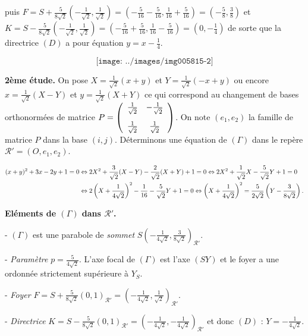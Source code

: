 {\begin{enumerate}
{puis $F=S+\frac{5}{8\sqrt{2}}\left(-\frac{1}{\sqrt{2}},\frac{1}{\sqrt{2}}\right)=\left(-\frac{5}{16}-\frac{5}{16},\frac{1}{16}+\frac{5}{16}\right)=\left(-\frac{5}{8},\frac{3}{8}\right)$  
et $K =S-\frac{5}{8\sqrt{2}}\left(-\frac{1}{\sqrt{2}},\frac{1}{\sqrt{2}}\right)=\left(-\frac{5}{16}+\frac{5}{16},\frac{1}{16}-\frac{5}{16}\right)=\left(0,-\frac{1}{4}\right)$ de sorte que la directrice $(D)$ a pour équation $y=x-\frac{1}{4}$.

$$\texttt{[image: ../images/img005815-2]}$$



\textbf{2ème étude.} On pose $X =\frac{1}{\sqrt{2}}(x+y)$ et $Y=\frac{1}{\sqrt{2}}(-x+y)$ ou encore $x=\frac{1}{\sqrt{2}}(X-Y)$ et $y=\frac{1}{\sqrt{2}}(X+Y)$ ce qui correspond au changement de bases orthonormées de matrice $P=\left(
\begin{array}{cc}
\frac{1}{\sqrt{2}}&-\frac{1}{\sqrt{2}}\\
\rule{0mm}{6mm}\frac{1}{\sqrt{2}}&\frac{1}{\sqrt{2}}
\end{array}
\right)$. On note $(e_1,e_2)$ la famille de matrice $P$ dans la base $(i,j)$. Déterminons une équation de $(\Gamma)$ dans le repère $\mathcal{R}'=(O,e_1,e_2)$.

\begin{align*}\ensuremath
(x+y)^2+3x-2y+1=0&\Leftrightarrow2X^2+\frac{3}{\sqrt{2}}(X-Y)-\frac{2}{\sqrt{2}}(X+Y)+1 = 0\Leftrightarrow2X^2+\frac{1}{\sqrt{2}}X-\frac{5}{\sqrt{2}}Y+1=0\\
 &\Leftrightarrow2\left(X+\frac{1}{4\sqrt{2}}\right)^2-\frac{1}{16}-\frac{5}{\sqrt{2}}Y+1=0\Leftrightarrow\left(X+\frac{1}{4\sqrt{2}}\right)^2=\frac{5}{2\sqrt{2}}\left(Y-\frac{3}{8\sqrt{2}}\right).
\end{align*}

\textbf{Eléments de $(\Gamma)$ dans $\mathcal{R}'$.}

- $(\Gamma)$ est une parabole de \emph{sommet} $S\left(-\frac{1}{4\sqrt{2}},\frac{3}{8\sqrt{2}}\right)_{\mathcal{R}'}$.

- \emph{Paramètre} $p =\frac{5}{4\sqrt{2}}$. L'axe focal de $(\Gamma)$ est l'axe $(SY)$ et le foyer a une ordonnée strictement supérieure à $Y_S$. 

- \emph{Foyer} $F = S+\frac{5}{8\sqrt{2}}(0,1)_{\mathcal{R}'}=\left(-\frac{1}{4\sqrt{2}},\frac{1}{\sqrt{2}}\right)_{\mathcal{R}'}$.

- \emph{Directrice} $K = S-\frac{5}{8\sqrt{2}}(0,1)_{\mathcal{R}'}=\left(-\frac{1}{4\sqrt{2}},-\frac{1}{4\sqrt{2}}\right)_{\mathcal{R}'}$ et donc $(D)$ : $Y = -\frac{1}{4\sqrt{2}}$.

}
\end{enumerate}}
